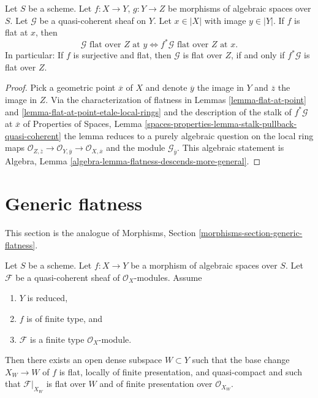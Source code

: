 \begin{lemma}
\label{lemma-flat-permanence}
Let $S$ be a scheme. Let $f : X \to Y$, $g : Y \to Z$ be morphisms of
algebraic spaces over $S$. Let $\mathcal{G}$ be a quasi-coherent sheaf on $Y$.
Let $x \in |X|$ with image $y \in |Y|$.
If $f$ is flat at $x$, then
$$
\mathcal{G}\text{ flat over }Z\text{ at }y
\Leftrightarrow
f^*\mathcal{G}\text{ flat over }Z\text{ at }x.
$$
In particular: If $f$ is surjective and flat, then
$\mathcal{G}$ is flat over $Z$, if and only if
$f^*\mathcal{G}$ is flat over $Z$.
\end{lemma}

\begin{proof}
Pick a geometric point $\overline{x}$ of $X$ and denote
$\overline{y}$ the image in $Y$ and $\overline{z}$ the image in $Z$.
Via the characterization of flatness in
Lemmas \ref{lemma-flat-at-point} and
\ref{lemma-flat-at-point-etale-local-rings}
and the description of the stalk of $f^*\mathcal{G}$ at $\overline{x}$ of
Properties of Spaces,
Lemma \ref{spaces-properties-lemma-stalk-pullback-quasi-coherent}
the lemma reduces to a purely algebraic question on the local
ring maps
$\mathcal{O}_{Z, \overline{z}} \to \mathcal{O}_{Y, \overline{y}}
\to \mathcal{O}_{X, \overline{x}}$
and the module $\mathcal{G}_{\overline{y}}$.
This algebraic statement is
Algebra, Lemma \ref{algebra-lemma-flatness-descends-more-general}.
\end{proof}






\section{Generic flatness}
\label{section-generic-flatness}

\noindent
This section is the analogue of
Morphisms, Section \ref{morphisms-section-generic-flatness}.

\begin{proposition}
\label{proposition-generic-flatness-reduced}
Let $S$ be a scheme.
Let $f : X \to Y$ be a morphism of algebraic spaces over $S$.
Let $\mathcal{F}$ be a quasi-coherent sheaf of $\mathcal{O}_X$-modules.
Assume
\begin{enumerate}
\item $Y$ is reduced,
\item $f$ is of finite type, and
\item $\mathcal{F}$ is a finite type $\mathcal{O}_X$-module.
\end{enumerate}
Then there exists an open dense subspace $W \subset Y$ such that
the base change $X_W \to W$ of $f$ is flat, locally of finite presentation, and
quasi-compact and such that $\mathcal{F}|_{X_W}$ is flat over $W$ and of
finite presentation over $\mathcal{O}_{X_W}$.
\end{proposition}

